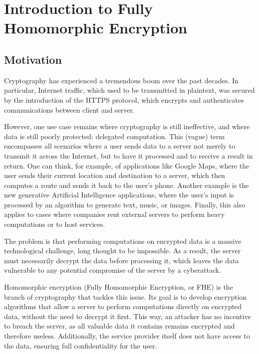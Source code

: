 
\chapter[Introduction to FHE]{Introduction to Fully Homomorphic Encryption}
\label{chap:fhe}


\section{Motivation}

Cryptography has experienced a tremendous boom over the past decades. In particular, Internet traffic, which used to be transmitted in plaintext, was secured by the introduction of the HTTPS protocol, which encrypts and authenticates communications between client and server.

However, one use case remains where cryptography is still ineffective, and where data is still poorly protected: delegated computation. This (vague) term encompasses all scenarios where a user sends data to a server not merely to transmit it across the Internet, but to have it processed and to receive a result in return. One can think, for example, of applications like Google Maps, where the user sends their current location and destination to a server, which then computes a route and sends it back to the user’s phone. Another example is the new generative Artificial Intelligence applications, where the user’s input is processed by an algorithm to generate text, music, or images. Finally, this also applies to cases where companies rent external servers to perform heavy computations or to host services.

The problem is that performing computations on encrypted data is a massive technological challenge, long thought to be impossible. As a result, the server must necessarily decrypt the data before processing it, which leaves the data vulnerable to any potential compromise of the server by a cyberattack.


Homomorphic encryption (Fully Homomorphic Encryption, or \gls{FHE}) is the branch of cryptography that tackles this issue. Its goal is to develop encryption algorithms that allow a server to perform computations directly on encrypted data, without the need to decrypt it first. This way, an attacker has no incentive to breach the server, as all valuable data it contains remains encrypted and therefore useless. Additionally, the service provider itself does not have access to the data, ensuring full confidentiality for the user.



